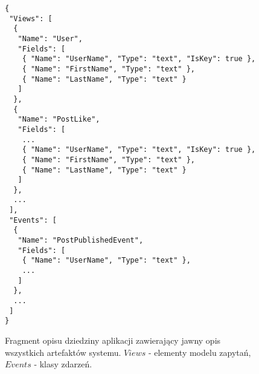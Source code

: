 \begin{figure}[!ht]
\begin{verbatim}
{
 "Views": [
  {
   "Name": "User",
   "Fields": [
    { "Name": "UserName", "Type": "text", "IsKey": true },
    { "Name": "FirstName", "Type": "text" },
    { "Name": "LastName", "Type": "text" }
   ]
  },
  {
   "Name": "PostLike",
   "Fields": [
    ...
    { "Name": "UserName", "Type": "text", "IsKey": true },
    { "Name": "FirstName", "Type": "text" },
    { "Name": "LastName", "Type": "text" }
   ]
  },
  ...
 ],
 "Events": [
  {
   "Name": "PostPublishedEvent",
   "Fields": [
    { "Name": "UserName", "Type": "text" },
    ...
   ]
  },
  ...
 ]
}
\end{verbatim}
\caption{
 Fragment opisu dziedziny aplikacji zawierający jawny opis wszystkich artefaktów systemu.
 $Views$ - elementy modelu zapytań, $Events$ - klasy zdarzeń.
}
\label{fig:single:model_verbose}
\end{figure}
